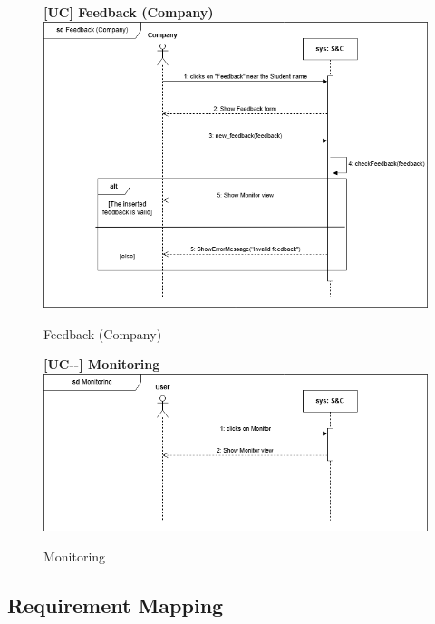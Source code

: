 \begin{figure}[H]
\textbf{[UC\nextUCDiagr] Feedback (Company)}\newline\newline
    \includegraphics[width=15cm]{Images/UC_diagram/RASD-UC25.drawio.png}
    \caption{Feedback (Company)}
\end{figure}

\begin{figure}[H]
\textbf{[UC\nextUCDiagr-\nextUCDiagr-\nextUCDiagr] Monitoring}\newline\newline
    \includegraphics[width=15cm]{Images/UC_diagram/RASD-UC24.drawio.png}
    \caption{Monitoring}
\end{figure}
\subsection{Requirement Mapping}
